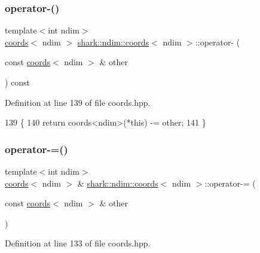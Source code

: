 \subsubsection{\texorpdfstring{operator-\/()}{operator-()}\hspace{0.1cm}{\footnotesize\ttfamily [2/2]}}
{\footnotesize\ttfamily template$<$int ndim$>$ \\
\hyperlink{structshark_1_1ndim_1_1coords}{coords}$<$ ndim $>$ \hyperlink{structshark_1_1ndim_1_1coords}{shark\+::ndim\+::coords}$<$ ndim $>$\+::operator-\/ (\begin{DoxyParamCaption}\item[{const \hyperlink{structshark_1_1ndim_1_1coords}{coords}$<$ ndim $>$ \&}]{other }\end{DoxyParamCaption}) const\hspace{0.3cm}{\ttfamily [inline]}}



Definition at line 139 of file coords.\+hpp.


\begin{DoxyCode}
139                                                                                    \{
140             \textcolor{keywordflow}{return} coords<ndim>(*this) -= other;
141         \}
\end{DoxyCode}
\hypertarget{structshark_1_1ndim_1_1coords_ad6f436507ab3409fe01edde347a665a9}{}\label{structshark_1_1ndim_1_1coords_ad6f436507ab3409fe01edde347a665a9} 
\subsubsection{\texorpdfstring{operator-\/=()}{operator-=()}}
{\footnotesize\ttfamily template$<$int ndim$>$ \\
\hyperlink{structshark_1_1ndim_1_1coords}{coords}$<$ ndim $>$ \& \hyperlink{structshark_1_1ndim_1_1coords}{shark\+::ndim\+::coords}$<$ ndim $>$\+::operator-\/= (\begin{DoxyParamCaption}\item[{const \hyperlink{structshark_1_1ndim_1_1coords}{coords}$<$ ndim $>$ \&}]{other }\end{DoxyParamCaption})\hspace{0.3cm}{\ttfamily [inline]}}



Definition at line 133 of file coords.\+hpp.


